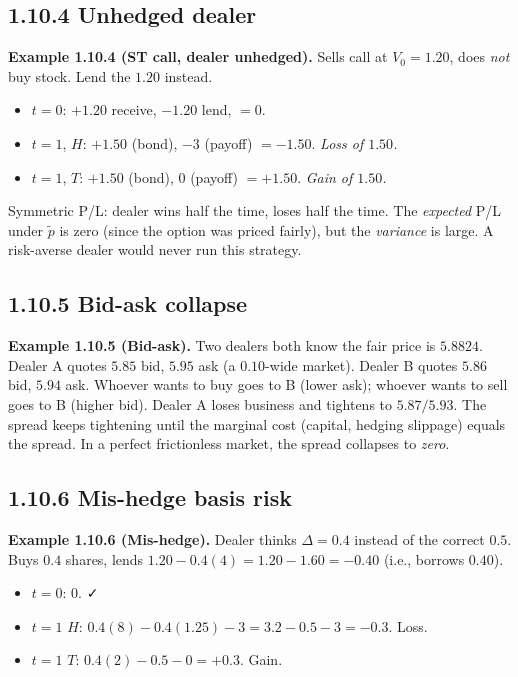 \documentclass[
  10pt,
  twoside]{book}
\providecommand{\tightlist}{%
  \setlength{\itemsep}{0pt}\setlength{\parskip}{0pt}}
\begin{document}
\subsection{1.10.4 Unhedged dealer}\label{unhedged-dealer}

\textbf{Example 1.10.4 (ST call, dealer unhedged).} Sells call at
\(V_0=1.20\), does \emph{not} buy stock. Lend the \(1.20\) instead.

\begin{itemize}
\tightlist
\item
  \(t=0\): \(+1.20\) receive, \(-1.20\) lend, \(= 0\).
\item
  \(t=1\), \(H\): \(+1.50\) (bond), \(-3\) (payoff) \(= -1.50\).
  \emph{Loss of \(1.50\).}
\item
  \(t=1\), \(T\): \(+1.50\) (bond), \(0\) (payoff) \(= +1.50\).
  \emph{Gain of \(1.50\).}
\end{itemize}

Symmetric P/L: dealer wins half the time, loses half the time. The
\emph{expected} P/L under \(\tilde p\) is zero (since the option was
priced fairly), but the \emph{variance} is large. A risk-averse dealer
would never run this strategy.

\subsection{1.10.5 Bid-ask collapse}\label{bid-ask-collapse}

\textbf{Example 1.10.5 (Bid-ask).} Two dealers both know the fair price
is \(5.8824\). Dealer A quotes \(5.85\) bid, \(5.95\) ask (a
\(0.10\)-wide market). Dealer B quotes \(5.86\) bid, \(5.94\) ask.
Whoever wants to buy goes to B (lower ask); whoever wants to sell goes
to B (higher bid). Dealer A loses business and tightens to
\(5.87/5.93\). The spread keeps tightening until the marginal cost
(capital, hedging slippage) equals the spread. In a perfect frictionless
market, the spread collapses to \emph{zero}.

\subsection{1.10.6 Mis-hedge basis risk}\label{mis-hedge-basis-risk}

\textbf{Example 1.10.6 (Mis-hedge).} Dealer thinks \(\Delta=0.4\)
instead of the correct \(0.5\). Buys \(0.4\) shares, lends
\(1.20 - 0.4(4) = 1.20 - 1.60 = -0.40\) (i.e., borrows \(0.40\)).

\begin{itemize}
\tightlist
\item
  \(t=0\): \(0\). ✓
\item
  \(t=1\) \(H\): \(0.4(8) - 0.4(1.25) - 3 = 3.2 - 0.5 - 3 = -0.3\).
  Loss.
\item
  \(t=1\) \(T\): \(0.4(2) - 0.5 - 0 = +0.3\). Gain.
\end{itemize}
\end{document}
